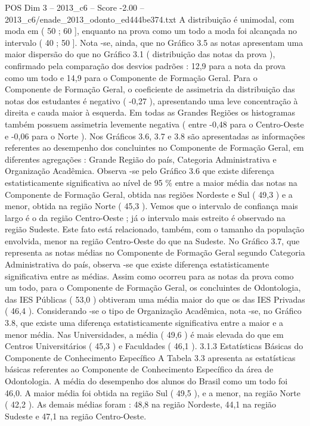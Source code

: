 \begin{textsample}{POS Dim 3 – 2013\_c6 – Score -2.00 – 2013\_c6/enade\_2013\_odonto\_ed444be374.txt}
A distribuição é unimodal, com moda em ( 50 ; 60 ], enquanto na prova como um todo a moda foi alcançada no intervalo ( 40 ; 50 ].
Nota -se, ainda, que no Gráfico 3.5 as notas apresentam uma maior dispersão do que no Gráfico 3.1 ( distribuição das notas da prova ), confirmado pela comparação dos desvios padrões : 12,9 para a nota da prova como um todo e 14,9 para o Componente de Formação Geral.
Para o Componente de Formação Geral, o coeficiente de assimetria da distribuição das notas dos estudantes é negativo ( -0,27 ), apresentando uma leve concentração à direita e cauda maior à esquerda.
Em todas as Grandes Regiões os histogramas também possuem assimetria levemente negativa ( entre -0,48 para o Centro-Oeste e -0,06 para o Norte ).
Nos Gráficos 3.6, 3.7 e 3.8 são apresentadas as informações referentes ao desempenho dos concluintes no Componente de Formação Geral, em diferentes agregações : Grande Região do país, Categoria Administrativa e Organização Acadêmica.
Observa -se pelo Gráfico 3.6 que existe diferença estatisticamente significativa ao nível de 95 \% entre a maior média das notas na Componente de Formação Geral, obtida nas regiões Nordeste e Sul ( 49,3 ) e a menor, obtida na região Norte ( 45,3 ).
Vemos que o intervalo de confiança mais largo é o da região Centro-Oeste ; já o intervalo mais estreito é observado na região Sudeste.
Este fato está relacionado, também, com o tamanho da população envolvida, menor na região Centro-Oeste do que na Sudeste.
No Gráfico 3.7, que representa as notas médias no Componente de Formação Geral segundo Categoria Administrativa do país, observa -se que existe diferença estatisticamente significativa entre as médias.
Assim como ocorreu para as notas da prova como um todo, para o Componente de Formação Geral, os concluintes de Odontologia, das IES Públicas ( 53,0 ) obtiveram uma média maior do que os das IES Privadas ( 46,4 ).
Considerando -se o tipo de Organização Acadêmica, nota -se, no Gráfico 3.8, que existe uma diferença estatisticamente significativa entre a maior e a menor média.
Nas Universidades, a média ( 49,6 ) é mais elevada do que em Centros Universitários ( 45,3 ) e Faculdades ( 46,1 ). 3.1.3 Estatísticas Básicas do Componente de Conhecimento Específico A Tabela 3.3 apresenta as estatísticas básicas referentes ao Componente de Conhecimento Específico da área de Odontologia.
A média do desempenho dos alunos do Brasil como um todo foi 46,0.
A maior média foi obtida na região Sul ( 49,5 ), e a menor, na região Norte ( 42,2 ).
As demais médias foram : 48,8 na região Nordeste, 44,1 na região Sudeste e 47,1 na região Centro-Oeste.

\end{textsample}

